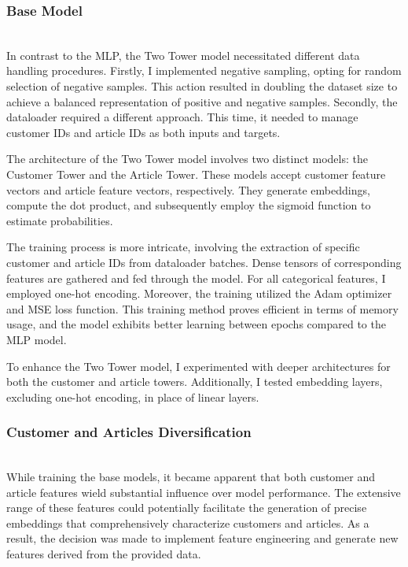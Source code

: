 \documentclass[conference,compsoc]{IEEEtran}
\begin{document}
\subsubsection{Base Model}\mbox{}\\
In contrast to the MLP, the Two Tower model necessitated different data handling procedures. Firstly, I implemented negative sampling, opting for random selection of negative samples. This action resulted in doubling the dataset size to achieve a balanced representation of positive and negative samples. Secondly, the dataloader required a different approach. This time, it needed to manage customer IDs and article IDs as both inputs and targets.

The architecture of the Two Tower model involves two distinct models: the Customer Tower and the Article Tower. These models accept customer feature vectors and article feature vectors, respectively. They generate embeddings, compute the dot product, and subsequently employ the sigmoid function to estimate probabilities.

The training process is more intricate, involving the extraction of specific customer and article IDs from dataloader batches. Dense tensors of corresponding features are gathered and fed through the model. For all categorical features, I employed one-hot encoding. Moreover, the training utilized the Adam optimizer and MSE loss function. This training method proves efficient in terms of memory usage, and the model exhibits better learning between epochs compared to the MLP model.

To enhance the Two Tower model, I experimented with deeper architectures for both the customer and article towers. Additionally, I tested embedding layers, excluding one-hot encoding, in place of linear layers.

\subsubsection{Customer and Articles Diversification}\mbox{}\\
While training the base models, it became apparent that both customer and article features wield substantial influence over model performance. The extensive range of these features could potentially facilitate the generation of precise embeddings that comprehensively characterize customers and articles. As a result, the decision was made to implement feature engineering and generate new features derived from the provided data.
\end{document}
